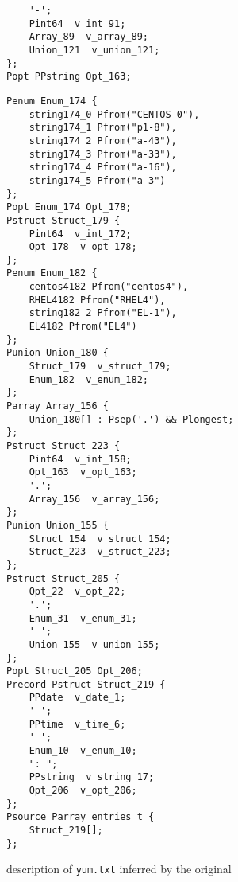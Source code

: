 \begin{figure}[t]
{\begin{minipage}[t]{0.33\columnwidth}
\begin{verbatim}
	'-';
	Pint64  v_int_91;
	Array_89  v_array_89;
	Union_121  v_union_121;
};
Popt PPstring Opt_163;
\end{verbatim}
\end{minipage}
\begin{minipage}[t]{0.33\columnwidth}
\begin{verbatim}
Penum Enum_174 {
	string174_0 Pfrom("CENTOS-0"),
	string174_1 Pfrom("p1-8"),
	string174_2 Pfrom("a-43"),
	string174_3 Pfrom("a-33"),
	string174_4 Pfrom("a-16"),
	string174_5 Pfrom("a-3")
};
Popt Enum_174 Opt_178;
Pstruct Struct_179 {
	Pint64  v_int_172;
	Opt_178  v_opt_178;
};
Penum Enum_182 {
	centos4182 Pfrom("centos4"),
	RHEL4182 Pfrom("RHEL4"),
	string182_2 Pfrom("EL-1"),
	EL4182 Pfrom("EL4")
};
Punion Union_180 {
	Struct_179  v_struct_179;
	Enum_182  v_enum_182;
};
Parray Array_156 {
	Union_180[] : Psep('.') && Plongest;
};
Pstruct Struct_223 {
	Pint64  v_int_158;
	Opt_163  v_opt_163;
	'.';
	Array_156  v_array_156;
};
Punion Union_155 {
	Struct_154  v_struct_154;
	Struct_223  v_struct_223;
};
Pstruct Struct_205 {
	Opt_22  v_opt_22;
	'.';
	Enum_31  v_enum_31;
	' ';
	Union_155  v_union_155;
};
Popt Struct_205 Opt_206;
Precord Pstruct Struct_219 {
	PPdate  v_date_1;
	' ';
	PPtime  v_time_6;
	' ';
	Enum_10  v_enum_10;
	": ";
	PPstring  v_string_17;
	Opt_206  v_opt_206;
};
Psource Parray entries_t {
	Struct_219[];
};
\end{verbatim}
\end{minipage}
}
\caption{\pads{} description of {\tt yum.txt} inferred by the original \learnpads}\label{fig:yum-bad}
\end{figure}

